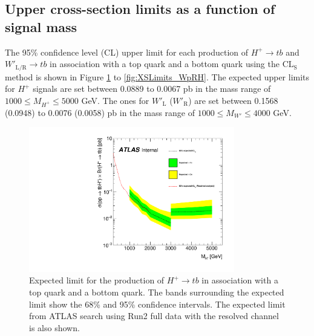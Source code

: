 \subsection{Upper cross-section limits as a function of signal mass}
\label{subsec:Upperlimits}
The 95\% confidence level (CL) upper limit for each production of $H^{+}{\rightarrow}tb$ and $W'_{\text{L/R}}{\rightarrow}tb$ in association with a top quark and a bottom quark using the $\text{CL}_{\text{S}}$ method is shown in Figure \ref{fig:XSLimits_Hp} to \ref{fig:XSLimits_WpRH}. The expected upper limits for $H^{+}$ signals are set between 0.0889 to 0.0067 pb in the mass range of $1000 \leq M_{H^{+}} \leq 5000$ GeV. The ones for $W'_{\text{L}}$ ($W'_{\text{R}}$) are set between 0.1568 (0.0948) to 0.0076 (0.0058) pb in the mass range of $1000 \leq M_{W'} \leq 4000$ GeV.

\begin{figure}[H]
  \centering
  \includegraphics[width=0.8\textwidth]{images/ProfileLHFit/XSUpperLimits_Hp.pdf}
  \caption{Expected limit for the production of $H^{+}{\rightarrow}tb$ in association with a top quark and a bottom quark. The bands surrounding the expected limit show the 68\% and 95\% confidence intervals. The expected limit from ATLAS search using Run2 full data with the resolved channel is also shown\cite{HDBS-2021-02}.}
  \label{fig:XSLimits_Hp}
\end{figure}

